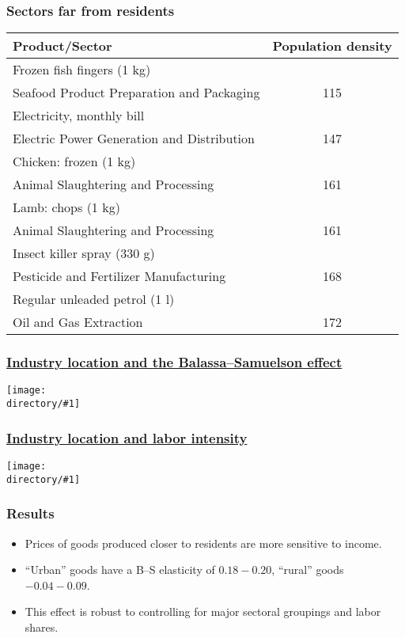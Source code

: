 \documentclass[compress,mathserif]{beamer}
\newcounter{ora}
\newcounter{perc}
\newcounter{percek}
\newcommand{\directory}{figures}
\newcommand{\widefigure}[2]{\begin{frame}\frametitle{\hyperlink{#1back}{#2}}\hypertarget{#1}{{\begin{center}\texttt{[image: \\directory/\#1]}\end{center}}}\end{frame}}
\renewcommand{\time}[1]{\addtocounter{percek}{#1}}
\begin{document}
\begin{frame}\frametitle{Sectors far from residents}
\begin{center}
\begin{tabular}{lc}
  \hline
  Product/Sector & Population density\\
  \hline
  Frozen fish fingers (1 kg)\\
  \hspace*{1em}Seafood Product Preparation and Packaging &115\\
  Electricity, monthly bill\\
  \hspace*{1em}Electric Power Generation and Distribution & 147\\
  Chicken: frozen (1 kg)\\
  \hspace*{1em}Animal Slaughtering and Processing & 161\\
  Lamb: chops (1 kg)\\
  \hspace*{1em}Animal Slaughtering and Processing & 161\\
  Insect killer spray (330 g)\\
  \hspace*{1em}Pesticide and Fertilizer Manufacturing & 168\\
  Regular unleaded petrol (1 l)\\
  \hspace*{1em}Oil and Gas Extraction & 172\\
  \hline
\end{tabular}
\end{center}
\end{frame}
\time 4

\widefigure{eiureg}{Industry location and the Balassa--Samuelson effect}
\time 3
\widefigure{eiuman}{Industry location and labor intensity}
\time 2

\begin{frame}\frametitle{Results}
\begin{itemize}
\item Prices of goods produced closer to residents are more sensitive to income.
\item ``Urban'' goods have a B--S elasticity of $0.18-0.20$, ``rural'' goods $-0.04-0.09$.
\item This effect is robust to controlling for major sectoral groupings and labor shares.
\end{itemize}
\end{frame}
\end{document}
